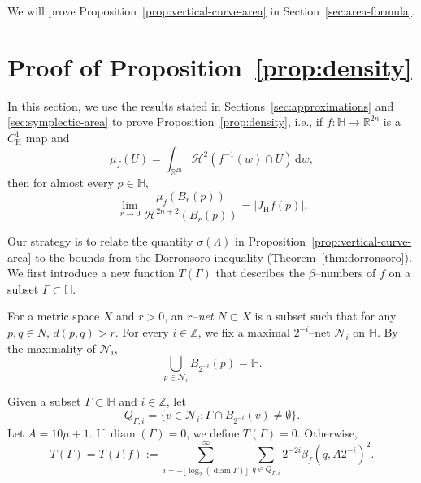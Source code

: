 \documentclass[12pt,reqno]{amsart}
\newcommand{\cH}{\mathcal{H}}
\newcommand{\cN}{\mathcal{N}}
\newcommand{\JfH}{J_\mathrm{H}f}
\newcommand{\HH}{\mathbb{H}}
\newcommand{\R}{\mathbb{R}}
\newcommand{\Z}{\mathbb{Z}}
\newcommand{\ud}[0]{\,\mathrm{d}}
\newcommand{\from}{\colon}
\theoremstyle{remark}
\newcommand{\0}{\mathbf{0}}
\renewcommand{\1}{\mathbf 1}
\DeclareMathOperator{\diam}{diam}
\begin{document}
We will prove Proposition~\ref{prop:vertical-curve-area} in Section~\ref{sec:area-formula}.
\section{Proof of Proposition~\ref{prop:density}}\label{sec:density-proof}

In this section, we use the results stated in Sections~\ref{sec:approximations} and \ref{sec:symplectic-area} to prove Proposition~\ref{prop:density}, i.e., if $f\from \HH\to \R^{2n}$ is a $C^1_{\mathrm{H}}$ map and
$$\mu_f(U) = \int_{\R^{2n}} \cH^2(f^{-1}(w)\cap U)\ud w,$$
then for almost every $p\in \HH$,
$$\lim_{r\to 0} \frac{\mu_f(B_r(p))}{\cH^{2n+2}(B_r(p))} = |\JfH(p)|.$$

Our strategy is to relate the quantity $\sigma(\Lambda)$ in Proposition~\ref{prop:vertical-curve-area} to the bounds from the Dorronsoro inequality (Theorem~\ref{thm:dorronsoro}). We first introduce a new function $T(\Gamma)$ that describes the $\beta$--numbers of $f$ on a subset $\Gamma\subset \HH$. 

For a metric space $X$ and $r>0$, an \emph{$r$--net} $N\subset X$ is a subset such that for any $p,q\in N$, $d(p,q) > r$. For every $i \in \Z$, we fix a maximal $2^{-i}$--net $\cN_i$ on $\HH$. By the maximality of $\cN_i$,
$$\bigcup_{p\in \cN_i} B_{2^{-i}}(p) = \HH.$$

Given a subset $\Gamma\subset \HH$ and $i\in \Z$, let
\begin{equation}\label{eq:def-Q-Gamma}
  Q_{\Gamma, i} = \{v\in \cN_i : \Gamma \cap B_{2^{-i}}(v) \ne \emptyset\}.
\end{equation}
Let $A = 10\mu + 1$. If $\diam(\Gamma)=0$, we define $T(\Gamma)=0$. Otherwise, 
\begin{equation}\label{eq:def-T}
  T(\Gamma) = T(\Gamma;f) := \sum_{i=-\lfloor \log_2(\diam \Gamma)\rfloor}^\infty \sum_{q\in Q_{\Gamma, i}} 2^{-2i} \beta_f(q, A 2^{-i})^2.
\end{equation}
\end{document}
